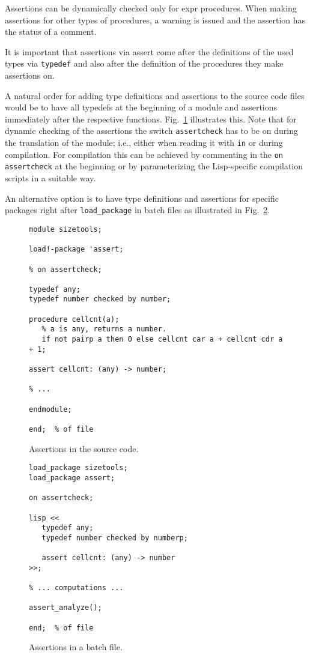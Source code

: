 Assertions can be dynamically checked only for expr procedures. When
making assertions for other types of procedures, a warning is issued and
the assertion has the status of a comment.

It is important that assertions via assert come after the definitions of
the used types via \texttt{typedef} and also after the definition of the
procedures they make assertions on.

A natural order for adding type definitions and assertions to the source
code files would be to have all typedefs at the beginning of a module
and assertions immediately after the respective functions.
Fig.~\ref{FIG:assMod} illustrates this. Note that for dynamic checking
of the assertions the switch \texttt{assertcheck} has to be on during
the translation of the module; i.e., either when reading it with
\texttt{in} or during compilation. For compilation this can be achieved
by commenting in the \texttt{on assertcheck} at the beginning or by
parameterizing the Lisp-specific compilation scripts in a suitable way.

An alternative option is to have type definitions and assertions for
specific packages right after \texttt{load\_package} in batch files as
illustrated in Fig.~\ref{FIG:assBat}.
\begin{figure}
  \begin{small}
\begin{verbatim}
module sizetools;

load!-package 'assert;

% on assertcheck;

typedef any;
typedef number checked by number;

procedure cellcnt(a);
   % a is any, returns a number.
   if not pairp a then 0 else cellcnt car a + cellcnt cdr a + 1;

assert cellcnt: (any) -> number;

% ...

endmodule;

end;  % of file
\end{verbatim}
  \end{small}
  \caption{Assertions in the source code.\label{FIG:assMod}}
\end{figure}

\begin{figure}
  \begin{small}
\begin{verbatim}
load_package sizetools;
load_package assert;

on assertcheck;

lisp <<
   typedef any;
   typedef number checked by numberp;

   assert cellcnt: (any) -> number
>>;

% ... computations ...

assert_analyze();

end;  % of file
\end{verbatim}
  \end{small}
  \caption{Assertions in a batch file.\label{FIG:assBat}}
\end{figure}

